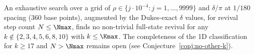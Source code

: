 \begin{theorem}
\label{thm:1d-nonexistence}
An exhaustive search over a grid of $\rho \in \{j \cdot
10^{-4} : j = 1, \ldots, 9999\}$ and $\delta/\pi$ at $1/180$
spacing (360 base points), augmented by the Dukes-exact
$\delta$ values, for revival step count $N \le \Nmax$, finds no
non-trivial full-state revival for any $k \notin \{2, 3, 4,
5, 6, 8, 10\}$ with $k \le \Kmax$. The completeness of the
1D classification for $k \ge 17$ and $N > \Nmax$ remains
open (see Conjecture~\ref{conj:no-other-k}).
\end{theorem}
